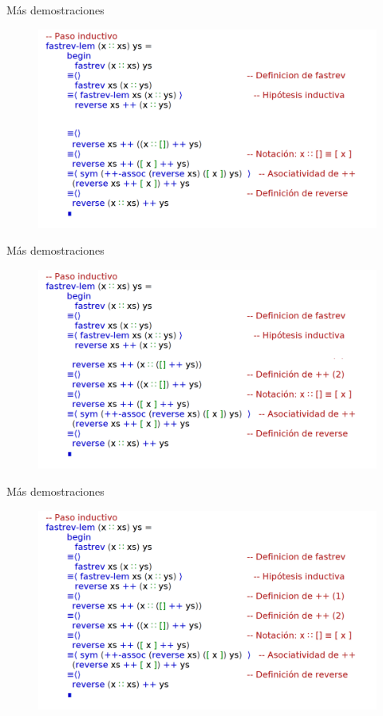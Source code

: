 \documentclass[11pt]{beamer}
\begin{document}
\begin{frame}{Más demostraciones}
\begin{figure}
\includegraphics[scale=0.65]{img/fastrev-lem-dem05b}
\end{figure}
\end{frame}


\begin{frame}{Más demostraciones}
\begin{figure}
\includegraphics[scale=0.65]{img/fastrev-lem-dem05c}
\end{figure}
\end{frame}


\begin{frame}{Más demostraciones}
\begin{figure}
\includegraphics[scale=0.65]{img/fastrev-lem-dem06}
\end{figure}
\end{frame}
\end{document}
